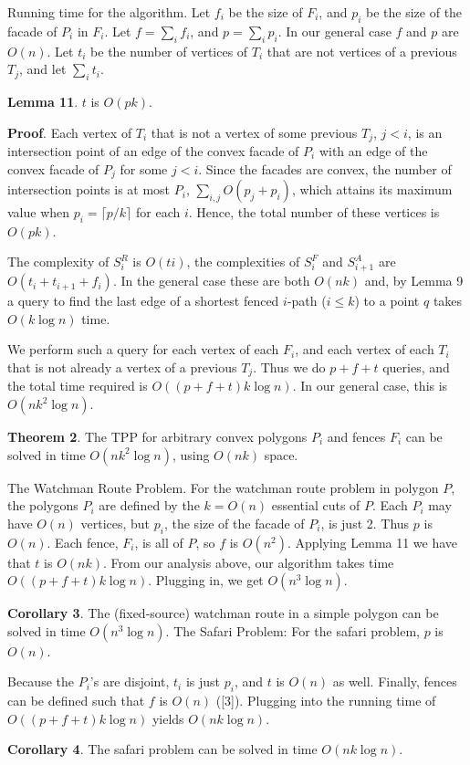 \documentclass[a4paper]{article}
\begin{document}
Running time for the algorithm. Let \(f_i\) be the size of \(F_i\), and \(p_i\) be the size of the facade of \(P_i\) in \(F_i\). Let \(f = \sum_{i} f_i\), and \(p = \sum_{i} p_i\). In our general case \(f\) and \(p\) are \(O(n)\). Let \(t_i\) be the number of vertices of \(T_i\) that are not vertices of a previous \(T_j\), and let \(\sum_i t_i\).

\textbf{Lemma 11}. \(t\) is \(O(pk)\).

\textbf{Proof}. Each vertex of \(T_i\) that is not a vertex of some previous \(T_j\), \(j < i\), is an intersection point of an edge of the convex facade of \(P_i\) with an edge of the convex facade of \(P_j\) for some \(j < i\). Since the facades are convex, the number of intersection points is at most \(P_i\), \(\sum_{i,j} O(p_j + p_i)\), which attains its maximum value when \(p_i = \lceil {p/k} \rceil\) for each \(i\). Hence, the total number of these vertices is \(O(pk)\). 

The complexity of \(S^R_i\) is \(O(ti)\), the complexities of \(S^F_i\) and \(S^A_{i+1}\) are \(O(t_i + t_{i+1} + f_i)\). In the general case these are both \(O(nk)\) and, by Lemma 9 a query to find the last edge of a shortest fenced \(i\)-path (\(i \le k\)) to a point \(q\) takes \(O(k \log n)\) time.

We perform such a query for each vertex of each \(F_i\), and each vertex of each \(T_i\) that is not already a vertex of a previous \(T_j\). Thus we do \(p + f + t\) queries, and the total time required is \(O((p + f + t)k \log n)\). In our general case, this is \(O(n k^2 \log n)\).

\textbf{Theorem 2}. The TPP for arbitrary convex polygons \(P_i\) and fences \(F_i\) can be solved in time \(O(n k^2 \log n)\), using \(O(nk)\) space.

The Watchman Route Problem. For the watchman route problem in polygon \(P\), the polygons \(P_i\) are defined by the \(k = O(n)\) essential cuts of \(P\). Each \(P_i\) may have \(O(n)\) vertices, but \(p_i\), the size of the facade of \(P_i\), is just 2. Thus \(p\) is \(O(n)\). Each fence, \(F_i\), is all of \(P\), so \(f\) is \(O(n^2)\). Applying Lemma 11 we have that \(t\) is \(O(nk)\). From our analysis above, our algorithm takes time \(O((p + f + t) k \log n)\). Plugging in, we get \(O(n ^ 3 \log n)\). 

\textbf{Corollary 3}. The (fixed-source) watchman route in a simple polygon can be solved in time \(O(n ^ 3 \log n)\). The Safari Problem: For the safari problem, \(p\) is \(O(n)\).

Because the \(P_i\)'s are disjoint, \(t_i\) is just \(p_i\), and \(t\) is \(O(n)\) as well. Finally, fences can be defined such that \(f\) is \(O(n)\) ([3]). Plugging into the running time of \(O((p + f + t) k \log n)\) yields \(O(n k \log n)\). 

\textbf{Corollary 4}. The safari problem can be solved in time
\(O(nk \log n)\).
\end{document}
